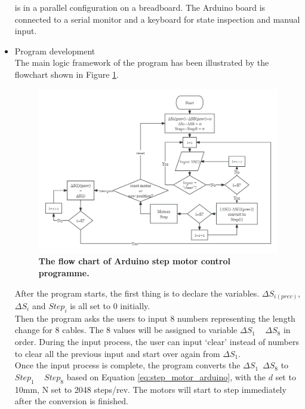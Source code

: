 \begin{itemize}
    is in a parallel configuration on a breadboard. The Arduino board is connected to a serial monitor and a 
    keyboard for state inspection and manual input.
    \item Program development \\
    The main logic framework of the program has been illustrated by the flowchart shown in Figure \ref{fig:motor_flowchart}.
    \begin{figure}[H] %
        \centering 
        \captionsetup{labelsep=colon}
        \includegraphics[width=1.0\textwidth]{Image/Design/flowchart_arduino_motor.png} 
        \caption[The flow chart of Arduino step motor control programme]
        {\centering \textbf{The flow chart of Arduino step motor control programme.}}
        \label{fig:motor_flowchart}
    \end{figure}
    After the program starts, the first thing is to declare the variables. $\Delta S_{i(prev)}$, $\Delta S_i$ and 
    $Step_i$ is all set to 0 initially. \\ Then the program asks the users to input 8 numbers representing the 
    length change for 8 cables. The 8 values will be assigned to variable $\Delta S_1$ ~ $\Delta S_8$ in order. 
    During the input process, the user can input `clear' instead of numbers to clear all the previous input and 
    start over again from $\Delta S_1$. \\
    Once the input process is complete, the program converts the $\Delta S_1$~$\Delta S_8$ to $Step_1$ ~ $Step_8$ 
    based on Equation \ref{eq:step_motor_arduino}, with the $d$ set to 10mm, N set to 2048 steps/rev. The motors 
    will start to step immediately after the conversion is finished. \\

\end{itemize}
